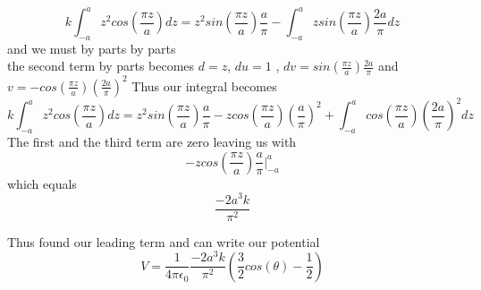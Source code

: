 \documentclass{article}
\begin{document}
\\
\begin{equation}
k\int_{-a}^{a}z^2cos(\frac{\pi z}{a})dz=z^2sin(\frac{\pi z}{a})\frac{a}{\pi} -\int_{-a}^{a}zsin(\frac{\pi z}{a})\frac{2a}{\pi}dz
\end{equation}
and we must by parts by parts
\\
the second term by parts becomes $d=z$, $du=1$ , $ dv=sin(\frac{\pi z}{a})\frac{2a}{\pi}$ and $v=-cos(\frac{\pi z}{a})(\frac{2a}{\pi})^2$
Thus our integral becomes
\begin{equation}
k\int_{-a}^{a}z^2cos(\frac{\pi z}{a})dz=z^2sin(\frac{\pi z}{a})\frac{a}{\pi} -zcos(\frac{\pi z}{a})(\frac{a}{\pi})^2 +\int_{-a}^{a}cos(\frac{\pi z}{a})(\frac{2a}{\pi})^2dz
\end{equation}
The first and the third term are zero leaving us with 
\begin{equation}
-zcos(\frac{\pi z}{a})\frac{a}{\pi} \Big|_{-a}^a
\end{equation}
which equals
\begin{equation}
\frac{-2a^3k}{\pi^2}
\end{equation}

 Thus found our leading term and can write our potential
 \begin{equation}
V=\frac{1}{4\pi\epsilon_0}\frac{-2a^3k}{\pi^2}(\frac{3}{2}cos(\theta)-\frac{1}{2})
\end{equation}
\end{document}
